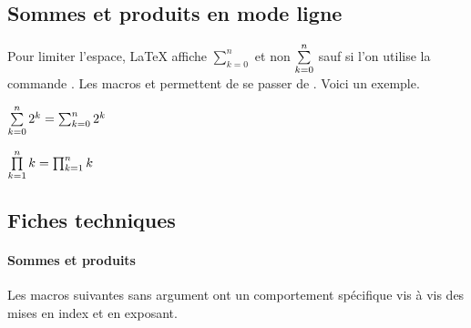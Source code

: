 \documentclass[12pt,a4paper]{article}
\begin{document}

\subsection{Sommes et produits en mode ligne}

Pour limiter l'espace, \LaTeX{} affiche $\sum_{k=0}^{n}$ et non $\sum\limits_{k=0}^{n}$ sauf si l'on utilise la commande .
Les macros  et  permettent de se passer de .
Voici un exemple.


\begin{latexex}
$\sum\limits_{k=0}^{n} 2^k =
 \sum_{k=0}^{n} 2^k$

$\prod\limits_{k=1}^{n} k =
 \prod_{k=1}^{n} k$
\end{latexex}




\subsection{Fiches techniques}

\paragraph{Sommes et produits}

Les macros suivantes sans argument ont un comportement spécifique vis à vis des mises en index et en exposant. 


\separation



\end{document}
